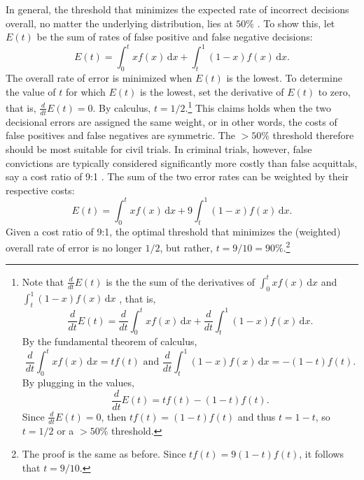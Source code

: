 \documentclass{article}
\begin{document}
In general, the threshold that minimizes the expected rate of incorrect decisions overall, no matter the underlying distribution, lies at $50\%$ 
\citep{kaye1982limits, Kaye1999Clarifying-the-, cheng2015}. To show this, 
let $E(t)$ %
be the sum of  rates of  false positive and false negative decisions:
%
\[E(t) = \int_0^t \! x f(x) \, \mathrm{d}x + \int_t^1 \! (1-x) f(x) \, \mathrm{d}x.
\]
%
 The overall rate of error is minimized when  $E(t)$ is the lowest. To determine the value of $t$ for which $E(t)$ is the lowest, set
the derivative of $E(t)$ %
to zero, that is, $\frac{d}{dt}  E(t)= 0$. 
By calculus, 
%
%
$t=1/2$.\footnote{Note that $\frac{d}{dt}  E(t)$ is the the sum of the derivatives of $\int_0^t \! x f(x) \, \mathrm{d}x$ 
and 
$\int_t^1 \!(1-x) f(x) \, \mathrm{d}x$
, that is,
%
\[\frac{d}{dt} E(t) = \frac{d}{dt}  \int_0^t \! x f(x) \, \mathrm{d}x + \frac{d}{dt}  \int_t^1 \! (1-x) f(x) \, \mathrm{d}x.\]
%
By the fundamental theorem of calculus, 
%
\[\frac{d}{dt}   \int_0^t \! x f(x) \, \mathrm{d}x = tf(t) \text{ and }
\frac{d}{dt}   \int_t^1 \! (1-x) f(x) \, \mathrm{d}x = -(1-t)f(t). \]
%
By plugging in the values, 
%
\[\frac{d}{dt}  E(t) = tf(t)  -(1-t)f(t). \]
%
Since $\frac{d}{dt}  E(t)= 0$, then $tf(t)  = (1-t)f(t)$
and thus
$t  = 1-t$, so 
$t  = 1/2$ or a $>50\%$ threshold.
} 
This claims holds when the two decisional errors are assigned the same weight, or in other words, the costs of false positives and false negatives are  symmetric. The $>50\%$ threshold therefore should be most suitable for civil trials. In criminal trials, however, false convictions are typically considered significantly more costly than false acquittals, say a cost ratio of 9:1 \cite[but see][]{epps2015}. The sum of the two error rates can be weighted by their respective costs:
%
\[E(t) = \int_0^t \! x f(x) \, \mathrm{d}x + 9\int_t^1 \! (1-x) f(x) \, \mathrm{d}x.
\]
%
Given a cost ratio of 9:1, the optimal threshold that minimizes the (weighted) overall rate of error is no longer $1/2$, but rather, $t=9/10=90\%$.\footnote{The proof is the same as before. Since $tf(t)  = 9(1-t)f(t)$, it follows that 
$t  = 9/10$.} 
\end{document}
